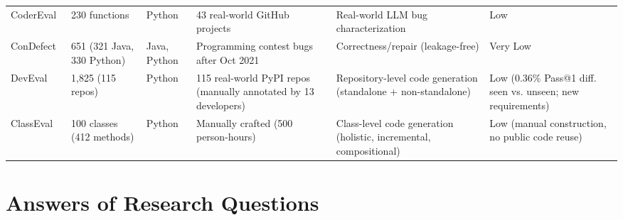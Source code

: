 \documentclass[10pt,a4paper]{article}
\begin{document}
\begin{table}[p]
\begin{tabularx}{\textwidth}{@{}p{92pt}p{55pt}p{70pt}p{105pt}X p{62pt}@{}}
CoderEval~\cite{tambon2025} & 230 functions & Python & 43 real-world GitHub projects & Real-world LLM bug characterization & Low \\
ConDefect~\cite{xia2024chatrepair} & 651 (321 Java, 330 Python) & Java, Python & Programming contest bugs after Oct 2021 & Correctness/repair (leakage-free) & Very Low \\
DevEval~\cite{li2024deveval} & 1,825 (115 repos) & Python & 115 real-world PyPI repos (manually annotated by 13 developers) & Repository-level code generation (standalone + non-standalone) & Low (0.36\% Pass@1 diff. seen vs. unseen; new requirements) \\
ClassEval~\cite{du2023classeval} & 100 classes (412 methods) & Python & Manually crafted (500 person-hours) & Class-level code generation (holistic, incremental, compositional) & Low (manual construction, no public code reuse) \\
\bottomrule
\end{tabularx}
\end{table}

\clearpage

\section{Answers of Research Questions}
\label{sec:answers}
\end{document}
